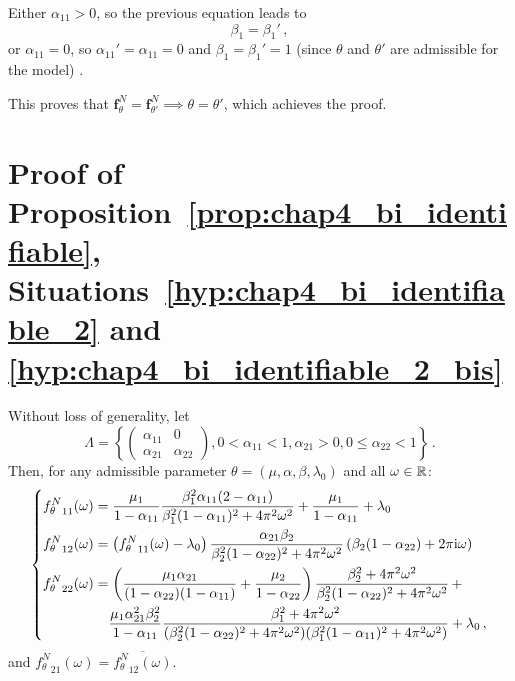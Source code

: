 \begin{subappendices}
Either $\alpha_{11} > 0$, so the previous equation leads to
\[
\beta_1 = \beta_1' \,,
\]
or $\alpha_{11} = 0$, so $\alpha_{11}' = \alpha_{11} = 0$ and $\beta_1 = \beta_1' = 1$ (since $\theta$ and $\theta'$ are admissible for the model) .

This proves that $\mathbf{f}_\theta^N = \mathbf{f}_{\theta'}^N \implies \theta = \theta'$, which achieves the proof.






\section{Proof of Proposition~\ref{prop:chap4_bi_identifiable}, Situations~\ref{hyp:chap4_bi_identifiable_2} and \ref{hyp:chap4_bi_identifiable_2_bis}}\label{appendix:chap4_bi_identifiable_2}

Without loss of generality, let
\[\Lambda = \left\{ \begin{pmatrix} \alpha_{11} & 0 \\ \alpha_{21} & \alpha_{22} \end{pmatrix}, 0 < \alpha_{11} < 1, \alpha_{21} > 0 , 0 \le \alpha_{22} < 1 \right\}\,.\]
Then, for any admissible parameter $\theta = (\mu, \alpha, \beta, \lambda_0)$ and all $\omega\in{\mathbb R}$:
\[\begin{dcases}
{f_\theta^N}_{11}(\omega) = \dfrac{\mu_1}{1-\alpha_{11}} \dfrac{\beta_1^2 \alpha_{11}(2-\alpha_{11})}{\beta_1^2(1-\alpha_{11})^2 + 4 \pi^2\omega^2} + \dfrac{\mu_1}{1-\alpha_{11}} + \lambda_0\\
{f_\theta^N}_{12}(\omega) = \left( {f_\theta^N}_{11}(\omega) - \lambda_0 \right) \dfrac{\alpha_{21} \beta_2}{\beta_2^2(1-\alpha_{22})^2 + 4\pi^2\omega^2}\left(\beta_2(1-\alpha_{22}) + 2 \pi \iu \omega\right)\\
{f_\theta^N}_{22}(\omega) = \left( \dfrac{\mu_1 \alpha_{21}}{(1-\alpha_{22})(1-\alpha_{11})} + \dfrac{\mu_2}{1-\alpha_{22}} \right)\dfrac{\beta_2^2 + 4\pi^2\omega^2}{\beta_2^2(1-\alpha_{22})^2 + 4\pi^2\omega^2} \,+ \\
\phantom{{f_\theta^N}_{22}(\omega) = } \dfrac{\mu_1 \alpha_{21}^2 \beta_2^2 }{1-\alpha_{11}} \dfrac{\beta_1^2 + 4\pi^2\omega^2}{(\beta_2^2(1-\alpha_{22})^2 + 4\pi^2\omega^2)(\beta_1^2(1-\alpha_{11})^2 + 4\pi^2\omega^2)} + \lambda_0\,,
\end{dcases}
\]
and ${f_\theta^N}_{21}(\omega) = \overline{{f_\theta^N}_{12}(\omega)}$.


\end{subappendices}
